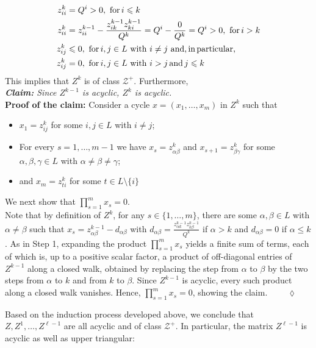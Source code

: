 \documentclass[11pt,fleqn]{article}
\begin{document}
\begin{description}
	\begin{align*}
	z^k_{ii}&= Q^i>0, \,\,\mbox{for}\, i\leqslant k\\
	z^k_{ii} & = z^{k-1}_{ii}  - \frac{z^{k-1}_{ik} z^{k-1}_{ki}}{Q^k} = Q^i - \frac{0}{Q^k} = Q^i >0,\,\,\mbox{for}\, i >k \\
	z^k_{ij} & \leqslant 0, \,\,\mbox{for}\, i,j \in L \mbox{ with } i \neq j\,\,\mbox{and,\,in\,particular,}\\
		z^k_{ij} & =  0, \,\,\mbox{for}\, i,j \in L \mbox{ with } i>j\,\mbox{and}\, j \leqslant k 		
	\end{align*}
	This implies that $Z^k$ is of class $\mathcal Z^+$. Furthermore, \\[1ex]
	\emph{\textbf{Claim:} Since $Z^{k-1}$ is acyclic, $Z^k$ is acyclic.} \\
	\textbf{Proof of the claim:} Consider a cycle $x =(x_1, \ldots , x_m)$ in $Z^{k}$ such that
	\begin{itemize}
		\item $x_1 = z^k_{ij}$ for some $i,j \in L$ with $i \neq j$;
		\item For every $s = 1, \ldots ,m-1$ we have $x_s = z^k_{\alpha \beta}$ and $x_{s+1} = z^k_{\beta \gamma}$ for some $\alpha , \beta ,\gamma \in L$ with $\alpha \neq \beta \neq \gamma$;
		\item and $x_m = z^k_{ti}$ for some $t \in L \setminus \{ i \}$
	\end{itemize}
	We next show that $\prod^m_{s=1} x_s =0$. \\ Note that by definition of $Z^{k}$, for any $s\in \{1,\ldots, m\}$, there are some $\alpha , \beta \in L$ with $\alpha \neq \beta$ such that $x_s = z^{k-1}_{\alpha \beta} - d_{\alpha \beta}$ with $d_{\alpha \beta} = \frac{z^{k-1}_{\alpha k} z^{k-1}_{k \beta}}{Q^k}$ if $\alpha > k$ and $d_{\alpha \beta} = 0$ if $\alpha \leqslant k$. As in Step 1, expanding the product $\prod^m_{s=1} x_s$ yields a finite sum of terms, each of which is, up to a positive scalar factor, a product of off-diagonal entries of $Z^{k-1}$ along a closed walk, obtained by replacing the step from $\alpha$ to $\beta$ by the two steps from $\alpha$ to $k$ and from $k$ to $\beta$. Since $Z^{k-1}$ is acyclic, every such product along a closed walk vanishes. Hence, $\prod^m_{s=1} x_s =0$, showing the claim. $\qquad\lozenge$
\end{description}
Based on the induction process developed above, we conclude that $Z, Z^1, \ldots ,Z^{\ell-1}$ are all acyclic and of class $\mathcal Z^+$. In particular, the matrix $Z^{\ell -1}$ is acyclic as well as upper triangular:
\end{document}
